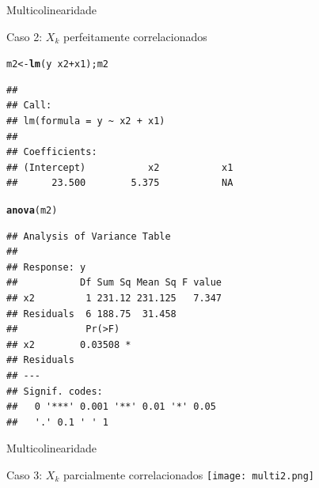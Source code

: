 \documentclass{beamer}\usepackage[]{graphicx}\usepackage[]{color}
\makeatletter
\newcommand{\hlopt}[1]{\textcolor[rgb]{0,0,0}{#1}}%
\newcommand{\hlstd}[1]{\textcolor[rgb]{0.345,0.345,0.345}{#1}}%
\newcommand{\hlkwb}[1]{\textcolor[rgb]{0.69,0.353,0.396}{#1}}%
\newcommand{\hlkwd}[1]{\textcolor[rgb]{0.737,0.353,0.396}{\textbf{#1}}}%
\newenvironment{kframe}{%
 \def\at@end@of@kframe{}%
 \ifinner\ifhmode%
  \def\at@end@of@kframe{\end{minipage}}%
  \begin{minipage}{\columnwidth}%
 \fi\fi%
 \def\FrameCommand##1{\hskip\@totalleftmargin \hskip-\fboxsep
 \colorbox{shadecolor}{##1}\hskip-\fboxsep
     \hskip-\linewidth \hskip-\@totalleftmargin \hskip\columnwidth}%
 \MakeFramed {\advance\hsize-\width
   \@totalleftmargin\z@ \linewidth\hsize
   \@setminipage}}%
 {\par\unskip\endMakeFramed%
 \at@end@of@kframe}
\newenvironment{knitrout}{}{} %
\renewenvironment{knitrout}{\setlength{\topsep}{0mm}}{}
\makeatother
\begin{document}
\begin{frame}[fragile]{Multicolinearidade}

Caso 2: $X_k$ perfeitamente correlacionados
\vfill

\begin{knitrout}\tiny
{}\color{fgcolor}\begin{kframe}
\begin{alltt}
\hlstd{m2} \hlkwb{<-} \hlkwd{lm}\hlstd{(y} \hlopt{~} \hlstd{x2} \hlopt{+} \hlstd{x1); m2}
\end{alltt}
\begin{verbatim}
## 
## Call:
## lm(formula = y ~ x2 + x1)
## 
## Coefficients:
## (Intercept)           x2           x1  
##      23.500        5.375           NA
\end{verbatim}
\begin{alltt}
\hlkwd{anova}\hlstd{(m2)}
\end{alltt}
\begin{verbatim}
## Analysis of Variance Table
## 
## Response: y
##           Df Sum Sq Mean Sq F value
## x2         1 231.12 231.125   7.347
## Residuals  6 188.75  31.458        
##            Pr(>F)  
## x2        0.03508 *
## Residuals          
## ---
## Signif. codes:  
##   0 '***' 0.001 '**' 0.01 '*' 0.05
##   '.' 0.1 ' ' 1
\end{verbatim}
\end{kframe}
\end{knitrout}

\end{frame}


\begin{frame}{Multicolinearidade}

Caso 3: $X_k$ parcialmente correlacionados
\vfill
\texttt{[image: multi2.png]}
 
\end{frame}
\end{document}
